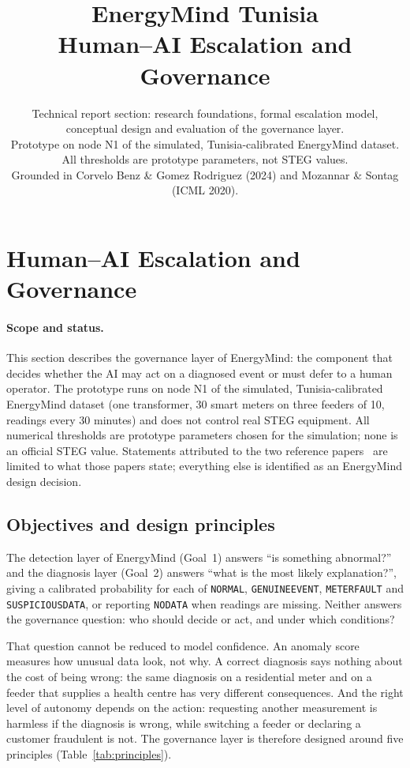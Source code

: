 \documentclass[11pt,a4paper]{article}
\title{EnergyMind Tunisia\\[2pt]\large Human--AI Escalation and Governance}
\author{}
\date{\small Technical report section: research foundations, formal escalation model, conceptual design and
evaluation of the governance layer.\\ Prototype on node N1 of the simulated, Tunisia-calibrated EnergyMind
dataset. All thresholds are prototype parameters, not STEG values.\\ Grounded in Corvelo Benz \& Gomez
Rodriguez (2024) and Mozannar \& Sontag (ICML 2020).}
\renewcommand{\_}{\textunderscore\allowbreak}
\providecommand{\GE}{\texttt{GENUINE\_EVENT}}
\providecommand{\MF}{\texttt{METER\_FAULT}}
\providecommand{\SD}{\texttt{SUSPICIOUS\_DATA}}
\providecommand{\ND}{\texttt{NO\_DATA}}
\providecommand{\NORM}{\texttt{NORMAL}}
\begin{document}
\maketitle
\setcounter{section}{2}

\section{Human--AI Escalation and Governance}
\label{sec:goal3}

\paragraph{Scope and status.} This section describes the governance layer of EnergyMind: the component that
decides whether the AI may act on a diagnosed event or must defer to a human operator. The prototype runs on
node N1 of the simulated, Tunisia-calibrated EnergyMind dataset (one transformer, 30 smart meters on three
feeders of 10, readings every 30 minutes) and does not control real STEG equipment. All numerical thresholds
are prototype parameters chosen for the simulation; none is an official STEG value. Statements attributed to
the two reference papers~\cite{benz,mozannar} are limited to what those papers state; everything else is
identified as an EnergyMind design decision.

\subsection{Objectives and design principles}
The detection layer of EnergyMind (Goal~1) answers ``is something abnormal?'' and the diagnosis layer
(Goal~2) answers ``what is the most likely explanation?'', giving a calibrated probability for each of
\NORM, \GE, \MF{} and \SD, or reporting \ND{} when readings are missing. Neither answers the governance
question: who should decide or act, and under which conditions?

That question cannot be reduced to model confidence. An anomaly score measures how unusual data look, not
why. A correct diagnosis says nothing about the cost of being wrong: the same diagnosis on a residential
meter and on a feeder that supplies a health centre has very different consequences. And the right level of
autonomy depends on the action: requesting another measurement is harmless if the diagnosis is wrong, while
switching a feeder or declaring a customer fraudulent is not. The governance layer is therefore designed
around five principles (Table~\ref{tab:principles}).
\end{document}

